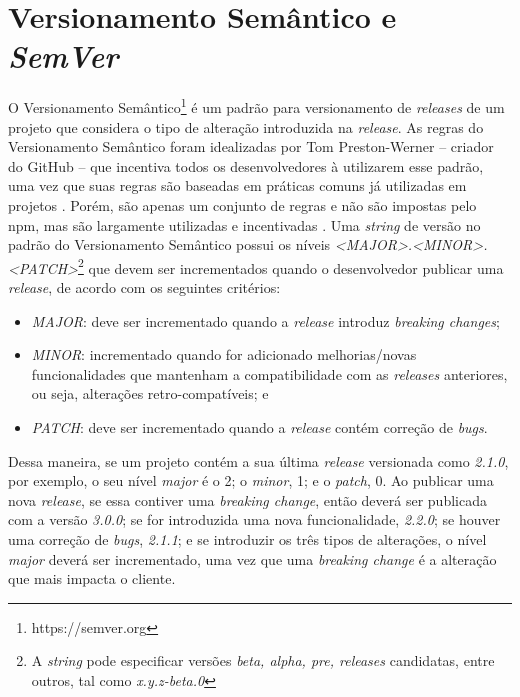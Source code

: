 \section{Versionamento Semântico e \textit{SemVer}}
\label{ref-teo:semver}

O Versionamento Semântico\footnote{https://semver.org} é um padrão para versionamento de \textit{releases} de um projeto que considera o tipo de alteração introduzida na \textit{release}. As regras do Versionamento Semântico foram idealizadas por Tom Preston-Werner -- criador do \textsf{GitHub} -- que incentiva todos os desenvolvedores à utilizarem esse padrão, uma vez que suas regras são baseadas em práticas comuns já utilizadas em projetos \cite{teorical_reference:semver}. Porém, são apenas um conjunto de regras e não são impostas pelo \textsf{npm}, mas são largamente utilizadas e incentivadas \cite{decan}. Uma \textit{string} de versão no padrão do Versionamento Semântico possui os níveis \textit{<MAJOR>.<MINOR>.<PATCH>}\footnote{A \textit{string} pode especificar versões \textit{beta, alpha, pre, releases} candidatas, entre outros, tal como \textit{x.y.z-beta.0}} que devem ser incrementados quando o desenvolvedor publicar uma \textit{release}, de acordo com os seguintes critérios:

\begin{itemize}
    \item \textit{MAJOR}: deve ser incrementado quando a \textit{release} introduz \textit{breaking changes};
    \item \textit{MINOR}: incrementado quando for adicionado melhorias/novas funcionalidades que mantenham a compatibilidade com as \textit{releases} anteriores, ou seja, alterações retro-compatíveis; e
    \item \textit{PATCH}: deve ser incrementado quando a \textit{release} contém correção de \textit{bugs}.
\end{itemize}{}

Dessa maneira, se um projeto contém a sua última \textit{release} versionada como \textit{2.1.0}, por exemplo, o seu nível \textit{major} é o 2; o \textit{minor}, 1; e o \textit{patch}, 0. Ao publicar uma nova \textit{release}, se essa contiver uma \textit{breaking change}, então deverá ser publicada com a versão \textit{3.0.0}; se for introduzida uma nova funcionalidade, \textit{2.2.0}; se houver uma correção de \textit{bugs}, \textit{2.1.1}; e se introduzir os três tipos de alterações, o nível \textit{major} deverá ser incrementado, uma vez que uma \textit{breaking change} é a alteração que mais impacta o cliente.


